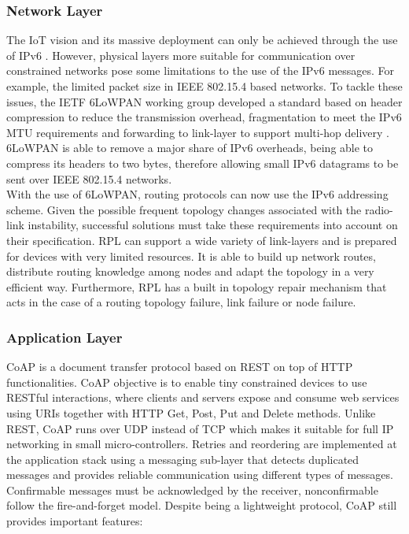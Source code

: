 \documentclass{sig-alternate-05-2015}
\begin{document}
\subsubsection{Network Layer}
\label{sec:network_layer}
The \gls{IoT} vision and its massive deployment can only be achieved through the use of IPv6 \cite{Pickard2015}. However, physical layers more suitable for communication over constrained networks pose some limitations to the use of the IPv6 messages. For example, the limited packet size in IEEE 802.15.4 based networks. To tackle these issues, the \gls{IETF} \gls{6LoWPAN} \cite{Shelby2012} working group developed a standard based on header compression to reduce the transmission overhead, fragmentation to meet the IPv6 \gls{MTU} requirements and forwarding to link-layer to support multi-hop delivery \cite{Hui2008}. \gls{6LoWPAN} is able to remove a major share of IPv6 overheads, being able to compress its headers to two bytes, therefore allowing small IPv6 datagrams to be sent over IEEE 802.15.4 networks. \\
With the use of 6LoWPAN, routing protocols can now use the IPv6 addressing scheme. Given the possible frequent topology changes associated with the radio-link instability, successful  solutions must take these requirements into account on their specification. \gls{RPL} \cite{Winter2012} can support a wide variety of link-layers and is prepared for devices with very limited resources. It is able to build up network routes, distribute routing knowledge among nodes and adapt the topology in a very efficient way. Furthermore, \gls{RPL} has a built in topology repair mechanism that acts in the case of a routing topology failure, link failure or node failure.

\subsubsection{Application Layer}
\gls{CoAP} \cite{Shelby2014} is a document transfer protocol based on \gls{REST} on top of \gls{HTTP} functionalities. \gls{CoAP} objective is to enable tiny constrained devices to use RESTful interactions, where clients and servers expose and consume web services using \gls{URIs} together with  \gls{HTTP} Get, Post, Put and Delete methods. Unlike \gls{REST}, \gls{CoAP} runs over \gls{UDP} instead of \gls{TCP} which makes it suitable for full IP networking in small micro-controllers. Retries and reordering are implemented at the application stack using a messaging sub-layer that detects duplicated messages and provides reliable communication using different types of messages. Confirmable messages must be acknowledged by the receiver, nonconfirmable follow the fire-and-forget model. Despite being a lightweight protocol, \gls{CoAP} still provides important features:
	
\end{document}
